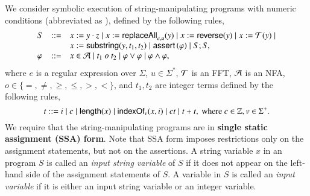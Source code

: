 
We consider symbolic execution of string-manipulating programs with numeric conditions (abbreviated as {\slint}), defined by the following rules, 
%
\[
\begin{array}{l c l}
S &::= &  x:= y \cdot z \mid x:= \mathsf{replaceAll}_{e,u}(y) \mid   x:=\mathsf{reverse}(y) \mid x:=\mathcal{T}(y) \mid \\
& & x := \mathsf{substring}(y, t_1, t_2)  \mid \textsf{assert}\left(\varphi\right)  \mid S;S, \\
\varphi &::= & x \in \mathcal{A} \mid t_1\ o\ t_2 \mid \varphi \vee \varphi \mid \varphi \wedge \varphi,
\end{array}
\]
where $e$ is a regular expression over $\Sigma$, $u \in \Sigma^*$, $\mathcal{T}$ is an FFT,  $\mathcal{A}$ is an NFA, $o \in \{=, \neq, \ge, \le, >, <\}$, and $t_1,t_2$ are integer terms defined by the following rules,
\[
t  ::= i \mid c \mid \mathsf{length}(x) \mid \mathsf{indexOf}_v(x, i) \mid  ct  \mid t + t, \mbox{ where } c \in \mathbb{Z}, v \in \Sigma^+.
\]
%
We require that the string-manipulating programs are in {\bf single static assignment (SSA) form}. Note that SSA form imposes restrictions only on the assignment statements, but not on the assertions. %
A string variable $x$ in an {\slint} program $S$ is called an \emph{input string variable} of $S$ if it does not appear on the left-hand side of the assignment statements of $S$. A variable in $S$ is called an \emph{input variable}  if it is either an input string variable or an integer variable.


